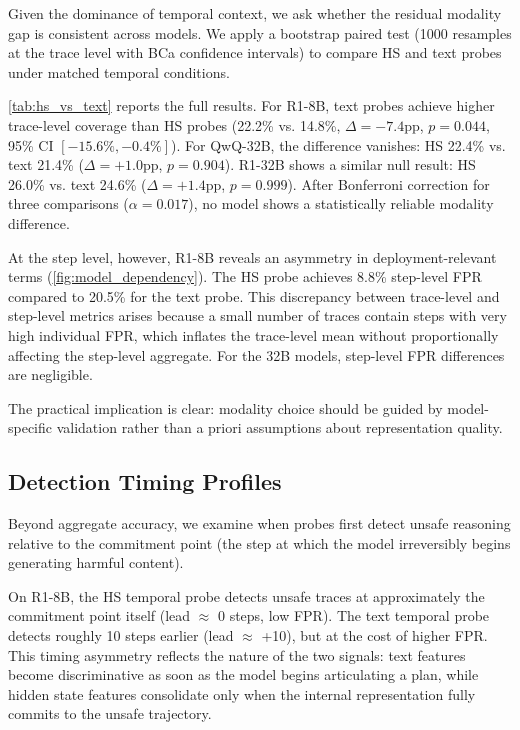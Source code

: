Given the dominance of temporal context, we ask whether the residual modality gap is consistent across models. We apply a bootstrap paired test (1000 resamples at the trace level with BCa confidence intervals) to compare HS and text probes under matched temporal conditions.

\cref{tab:hs_vs_text} reports the full results. For R1-8B, text probes achieve higher trace-level coverage than HS probes (22.2\% vs. 14.8\%, $\Delta{=}{-}7.4$pp, $p{=}0.044$, 95\% CI $[{-}15.6\%, {-}0.4\%]$). For QwQ-32B, the difference vanishes: HS 22.4\% vs. text 21.4\% ($\Delta{=}{+}1.0$pp, $p{=}0.904$). R1-32B shows a similar null result: HS 26.0\% vs. text 24.6\% ($\Delta{=}{+}1.4$pp, $p{=}0.999$). After Bonferroni correction for three comparisons ($\alpha{=}0.017$), no model shows a statistically reliable modality difference.

At the step level, however, R1-8B reveals an asymmetry in deployment-relevant terms (\cref{fig:model_dependency}). The HS probe achieves 8.8\% step-level FPR compared to 20.5\% for the text probe. This discrepancy between trace-level and step-level metrics arises because a small number of traces contain steps with very high individual FPR, which inflates the trace-level mean without proportionally affecting the step-level aggregate. For the 32B models, step-level FPR differences are negligible.

The practical implication is clear: modality choice should be guided by model-specific validation rather than a priori assumptions about representation quality.

\subsection{Detection Timing Profiles}
\label{sec:timing}

Beyond aggregate accuracy, we examine when probes first detect unsafe reasoning relative to the commitment point (the step at which the model irreversibly begins generating harmful content).

On R1-8B, the HS temporal probe detects unsafe traces at approximately the commitment point itself (lead $\approx$ 0 steps, low FPR). The text temporal probe detects roughly 10 steps earlier (lead $\approx$ +10), but at the cost of higher FPR. This timing asymmetry reflects the nature of the two signals: text features become discriminative as soon as the model begins articulating a plan, while hidden state features consolidate only when the internal representation fully commits to the unsafe trajectory.


